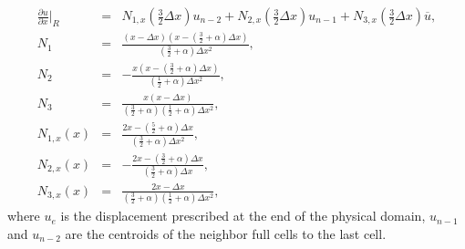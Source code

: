 \documentclass[a4paper,12pt]{article}
\begin{document}
\begin{eqnarray}
\frac{\partial u}{ \partial x}\vert_{R} &=& N_{1,x}(\frac{3}{2}\Delta x)u_{n-2} + N_{2,x}(\frac{3}{2}\Delta x)u_{n-1} + N_{3,x}(\frac{3}{2}\Delta x)\overline{u},\\
N_1 &=& \frac{(x-\Delta x)(x - (\frac{3}{2}+\alpha)\Delta x)}{(\frac{3}{2}+\alpha)\Delta x^2},\\
N_2 &=& - \frac{x(x- (\frac{3}{2}+\alpha)\Delta x)}{(\frac{1}{2}+\alpha)\Delta x^2},\\
N_3 &=& \frac{x(x-\Delta x)}{(\frac{3}{2}+\alpha)(\frac{1}{2}+\alpha)\Delta x^2},\\
N_{1,x}(x) &=& \frac{2x - (\frac{5}{2} + \alpha)\Delta x}{(\frac{3}{2}+\alpha)\Delta x^2},\\
N_{2,x}(x) &=& - \frac{2x - (\frac{3}{2}+\alpha)\Delta x}{(\frac{3}{2}+\alpha)\Delta x},\\
N_{3,x}(x) &=& \frac{2x - \Delta x}{(\frac{3}{2}+\alpha)(\frac{1}{2}+\alpha)\Delta x^2},
\end{eqnarray}
where $u_e$ is the displacement prescribed at the end of the physical domain, $u_{n-1}$ and $u_{n-2}$ are the centroids of the neighbor full cells to the last cell. 
\end{document}
